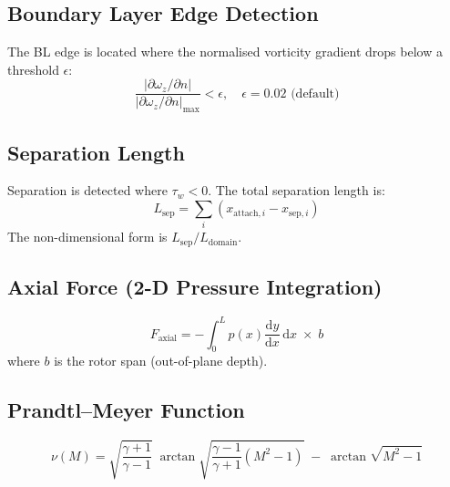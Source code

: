 \documentclass[11pt,letterpaper]{article}
\begin{document}
\subsection{Boundary Layer Edge Detection}

The BL edge is located where the normalised vorticity gradient drops below a
threshold $\epsilon$:
\begin{equation}
  \frac{|\partial \omega_z / \partial n|}{|\partial \omega_z / \partial n|_{\max}}
  < \epsilon, \quad \epsilon = 0.02 \text{ (default)}
\end{equation}

\subsection{Separation Length}

Separation is detected where $\tau_w < 0$.  The total separation length is:
\begin{equation}
  L_{\text{sep}} = \sum_{i} (x_{\text{attach},i} - x_{\text{sep},i})
\end{equation}
The non-dimensional form is $L_{\text{sep}} / L_{\text{domain}}$.

\subsection{Axial Force (2-D Pressure Integration)}

\begin{equation}
  F_{\text{axial}} = -\int_0^L p(x) \frac{\mathrm{d}y}{\mathrm{d}x}\,\mathrm{d}x
  \;\times\; b
\end{equation}
where $b$ is the rotor span (out-of-plane depth).

\subsection{Prandtl--Meyer Function}

\begin{equation}
  \nu(M) = \sqrt{\frac{\gamma+1}{\gamma-1}}\;
  \arctan\!\sqrt{\frac{\gamma-1}{\gamma+1}(M^2-1)}
  \;-\; \arctan\!\sqrt{M^2-1}
\end{equation}
\end{document}
